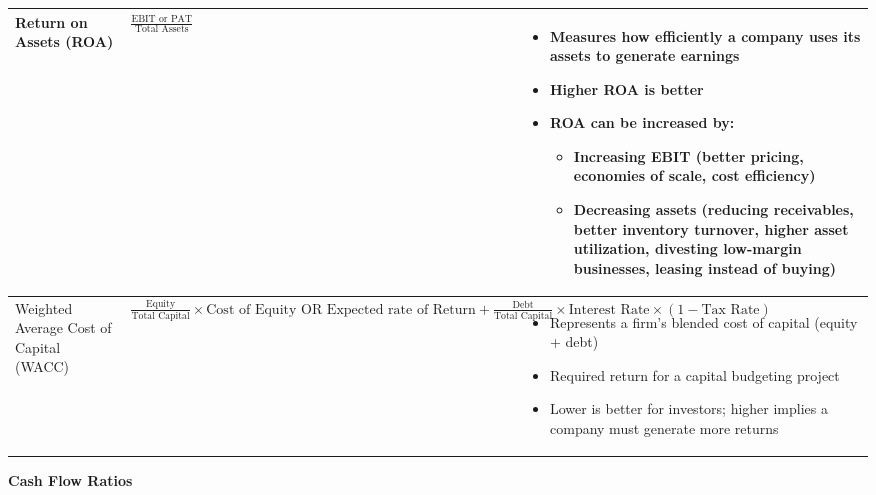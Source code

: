 \documentclass[12pt]{article}
\begin{document}
\begin{longtable}{|>{\raggedright\arraybackslash}m{4.5cm}|>{\raggedright\arraybackslash}m{5cm}|>{\raggedright\arraybackslash}m{6cm}|}
Return on Assets (ROA) & 
$\frac{\text{EBIT or PAT}}{\text{Total Assets}}$ &
\begin{itemize}
\item Measures how efficiently a company uses its assets to generate earnings
\item Higher ROA is better
\item ROA can be increased by:
    \begin{itemize}
        \item Increasing EBIT (better pricing, economies of scale, cost efficiency)
        \item Decreasing assets (reducing receivables, better inventory turnover, higher asset utilization, divesting low-margin businesses, leasing instead of buying)
    \end{itemize}
\end{itemize} \\
\hline

Weighted Average Cost of Capital (WACC) & 
$\frac{\text{Equity}}{\text{Total Capital}} \times \text{Cost of Equity OR Expected rate of Return} + \frac{\text{Debt}}{\text{Total Capital}} \times \text{Interest Rate} \times (1 - \text{Tax Rate})$ &
\begin{itemize}
\item Represents a firm's blended cost of capital (equity + debt)
\item Required return for a capital budgeting project
\item Lower is better for investors; higher implies a company must generate more returns
\end{itemize} \\
\hline
\end{longtable}

\textbf{Cash Flow Ratios}
\end{document}
